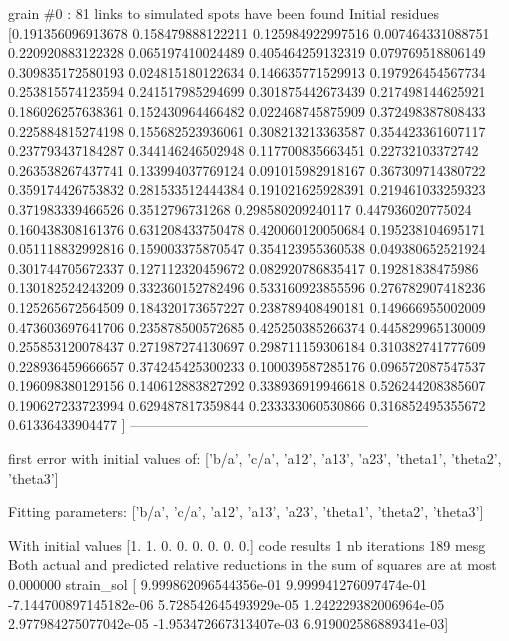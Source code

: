 \documentclass[letterpaper,10pt,english]{sphinxmanual}
\begin{document}
\begin{sphinxalltt}
grain \#0 : 81 links to simulated spots have been found
Initial residues {[}0.191356096913678 0.158479888122211 0.125984922997516 0.007464331088751
 0.220920883122328 0.065197410024489 0.405464259132319 0.079769518806149
 0.309835172580193 0.024815180122634 0.146635771529913 0.197926454567734
 0.253815574123594 0.241517985294699 0.301875442673439 0.217498144625921
 0.186026257638361 0.152430964466482 0.022468745875909 0.372498387808433
 0.225884815274198 0.155682523936061 0.308213213363587 0.354423361607117
 0.237793437184287 0.344146246502948 0.117700835663451 0.22732103372742
 0.263538267437741 0.133994037769124 0.091015982918167 0.367309714380722
 0.359174426753832 0.281533512444384 0.191021625928391 0.219461033259323
 0.371983339466526 0.3512796731268   0.298580209240117 0.447936020775024
 0.160438308161376 0.631208433750478 0.420060120050684 0.195238104695171
 0.051118832992816 0.159003375870547 0.354123955360538 0.049380652521924
 0.301744705672337 0.127112320459672 0.082920786835417 0.19281838475986
 0.130182524243209 0.332360152782496 0.533160923855596 0.276782907418236
 0.125265672564509 0.184320173657227 0.238789408490181 0.149666955002009
 0.473603697641706 0.235878500572685 0.425250385266374 0.445829965130009
 0.255853120078437 0.271987274130697 0.298711159306184 0.310382741777609
 0.228936459666657 0.374245425300233 0.100039587285176 0.096572087547537
 0.196098380129156 0.140612883827292 0.338936919946618 0.526244208385607
 0.190627233723994 0.629487817359844 0.233333060530866 0.316852495355672
 0.61336433904477 {]}
---------------------------------------------------



\sphinxstylestrong{***********************}
first error with initial values of: {[}'b/a', 'c/a', 'a12', 'a13', 'a23', 'theta1', 'theta2', 'theta3'{]}

\sphinxstylestrong{***********************}



\sphinxstylestrong{***********************}
Fitting parameters:   {[}'b/a', 'c/a', 'a12', 'a13', 'a23', 'theta1', 'theta2', 'theta3'{]}

\sphinxstylestrong{***********************}

With initial values {[}1. 1. 0. 0. 0. 0. 0. 0.{]}
code results 1
nb iterations 189
mesg Both actual and predicted relative reductions in the sum of squares
  are at most 0.000000
strain\_sol {[} 9.999862096544356e-01  9.999941276097474e-01 -7.144700897145182e-06
  5.728542645493929e-05  1.242229382006964e-05  2.977984275077042e-05
 -1.953472667313407e-03  6.919002586889341e-03{]}



\end{sphinxalltt}
\end{document}

